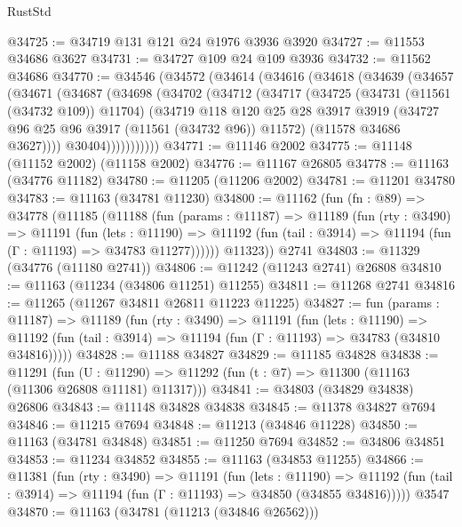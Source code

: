 \begin{lexlean}{RustStd}
\begin{coremodule}
@34725 := @34719 @131 @121 @24 @1976 @3936 @3920
@34727 := @11553 @34686 @3627
@34731 := @34727 @109 @24 @109 @3936
@34732 := @11562 @34686
@34770 := @34546
    (@34572
      (@34614
        (@34616
          (@34618
            (@34639
              (@34657
                (@34671
                  (@34687
                    (@34698
                      (@34702
                        (@34712
                          (@34717
                            (@34725
                              (@34731 (@11561 (@34732 @109)) @11704)
                              (@34719
                                @118
                                @120
                                @25
                                @28
                                @3917
                                @3919
                                (@34727 @96 @25 @96 @3917 (@11561 (@34732 @96)) @11572)
                                (@11578 @34686 @3627))))
                          @30404)))))))))))
@34771 := @11146 @2002
@34775 := @11148 (@11152 @2002) (@11158 @2002)
@34776 := @11167 @26805
@34778 := @11163 (@34776 @11182)
@34780 := @11205 (@11206 @2002)
@34781 := @11201 @34780
@34783 := @11163 (@34781 @11230)
@34800 := @11162
    (fun (fn : @89) =>
    @34778
      (@11185
        (@11188
          (fun (params : @11187) =>
          @11189
            (fun (rty : @3490) =>
            @11191
              (fun (lets : @11190) =>
              @11192 (fun (tail : @3914) => @11194 (fun (Γ : @11193) => @34783 @11277))))))
        @11323))
    @2741
@34803 := @11329 (@34776 (@11180 @2741))
@34806 := @11242 (@11243 @2741) @26808
@34810 := @11163 (@11234 (@34806 @11251) @11255)
@34811 := @11268 @2741
@34816 := @11265 (@11267 @34811 @26811 @11223 @11225)
@34827 := fun (params : @11187) =>
  @11189
    (fun (rty : @3490) =>
    @11191
      (fun (lets : @11190) =>
      @11192 (fun (tail : @3914) => @11194 (fun (Γ : @11193) => @34783 (@34810 @34816)))))
@34828 := @11188 @34827
@34829 := @11185 @34828
@34838 := @11291
    (fun (U : @11290) => @11292 (fun (t : @7) => @11300 (@11163 (@11306 @26808 @11181) @11317)))
@34841 := @34803 (@34829 @34838) @26806
@34843 := @11148 @34828 @34838
@34845 := @11378 @34827 @7694
@34846 := @11215 @7694
@34848 := @11213 (@34846 @11228)
@34850 := @11163 (@34781 @34848)
@34851 := @11250 @7694
@34852 := @34806 @34851
@34853 := @11234 @34852
@34855 := @11163 (@34853 @11255)
@34866 := @11381
    (fun (rty : @3490) =>
    @11191
      (fun (lets : @11190) =>
      @11192 (fun (tail : @3914) => @11194 (fun (Γ : @11193) => @34850 (@34855 @34816)))))
    @3547
@34870 := @11163 (@34781 (@11213 (@34846 @26562)))

\end{coremodule}
\end{lexlean}
